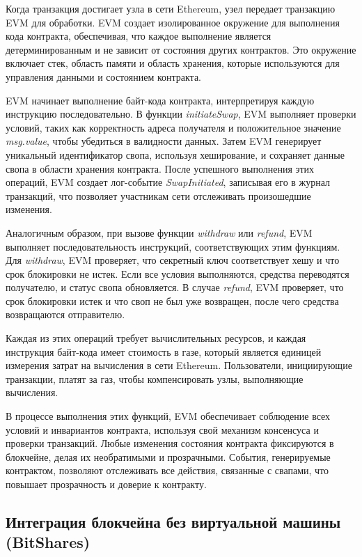 Когда транзакция достигает узла в сети Ethereum, узел передает транзакцию EVM для обработки. EVM создает изолированное окружение для выполнения кода контракта, обеспечивая, что каждое выполнение является детерминированным и не зависит от состояния других контрактов. Это окружение включает стек, область памяти и область хранения, которые используются для управления данными и состоянием контракта.

EVM начинает выполнение байт-кода контракта, интерпретируя каждую инструкцию последовательно. В функции \textit{initiateSwap}, EVM выполняет проверки условий, таких как корректность адреса получателя и положительное значение \textit{msg.value}, чтобы убедиться в валидности данных. Затем EVM генерирует уникальный идентификатор свопа, используя хеширование, и сохраняет данные свопа в области хранения контракта. После успешного выполнения этих операций, EVM создает лог-событие \textit{SwapInitiated}, записывая его в журнал транзакций, что позволяет участникам сети отслеживать произошедшие изменения.

Аналогичным образом, при вызове функции \textit{withdraw} или \textit{refund}, EVM выполняет последовательность инструкций, соответствующих этим функциям. Для \textit{withdraw}, EVM проверяет, что секретный ключ соответствует хешу и что срок блокировки не истек. Если все условия выполняются, средства переводятся получателю, и статус свопа обновляется. В случае \textit{refund}, EVM проверяет, что срок блокировки истек и что своп не был уже возвращен, после чего средства возвращаются отправителю.

Каждая из этих операций требует вычислительных ресурсов, и каждая инструкция байт-кода имеет стоимость в газе, который является единицей измерения затрат на вычисления в сети Ethereum. Пользователи, инициирующие транзакции, платят за газ, чтобы компенсировать узлы, выполняющие вычисления.

В процессе выполнения этих функций, EVM обеспечивает соблюдение всех условий и инвариантов контракта, используя свой механизм консенсуса и проверки транзакций. Любые изменения состояния контракта фиксируются в блокчейне, делая их необратимыми и прозрачными. События, генерируемые контрактом, позволяют отслеживать все действия, связанные с свапами, что повышает прозрачность и доверие к контракту.

\subsection{Интеграция блокчейна без виртуальной машины (BitShares)}

